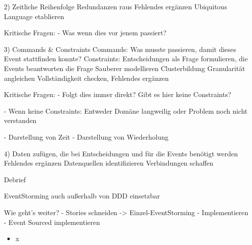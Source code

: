 2) Zeitliche Reihenfolge
Redundanzen raus
Fehlendes ergänzen
Ubiquitous Language etablieren

Kritische Fragen:
- Was wenn dies vor jenem passiert?

3) Commands \& Constraints
Commands: Was musste passieren, damit dieses Event stattfinden konnte?
Constraints: Entscheidungen als Frage formulieren, die Events beantworten die Frage
Sauberer modellieren
Clusterbildung
Granularität angleichen
Vollständigkeit checken, Fehlendes ergänzen

Kritische Fragen:
- Folgt dies immer direkt? Gibt es hier keine Constraints?

- Wenn keine Constraints: Entweder Domäne langweilig oder Problem noch nicht verstanden

- Darstellung von Zeit
- Darstellung von Wiederholung

4) Daten zufügen, die bei Entscheidungen und für die Events benötigt werden
Fehlendes ergänzen
Datenquellen identifizieren
Verbindungen schaffen


Debrief

EventStorming auch außerhalb von DDD einsetzbar



Wie geht's weiter?
- Stories schneiden -> Einzel-EventStorming
- Implementieren
- Event Sourced implementieren


\begin{frame}[fragile]{}

\begin{itemize}
\item x
\end{itemize}

\end{frame}

\begin{frame}[fragile]{}

\begin{center}
{
\LARGE
}
\end{center}

\end{frame}

\begin{frame}[fragile]{}

\begin{center}
\end{center}

\end{frame}


